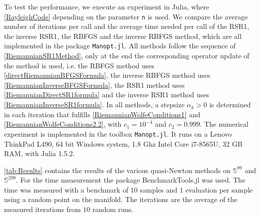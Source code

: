 To test the performance, we execute an experiment in Julia, where \cref{RayleighCode} depending on the parameter \lstinline!n! is used. We compare the average number of iterations per call and the average time needed per call of the RSR1, the inverse RSR1, the RBFGS and the inverse RBFGS method, which are all implemented in the package \lstinline!Manopt.jl!. All methods follow the sequence of \cref{RiemannianSR1Method}, only at the end the corresponding operator update of the method is used, i.e. the RBFGS method uses \cref{directRiemannianBFGSFormula}, the inverse RBFGS method uses \cref{RiemannianInverseBFGSFormula}, the RSR1 method uses \cref{RiemannianDirectSR1formula} and the inverse RSR1 method uses \cref{RiemannianInverseSR1formula}. In all methods, a stepsize $\alpha_k > 0$ is determined in each iteration that fulfills \cref{RiemannianWolfeConditions1} and \cref{RiemannianWolfeConditions2.2}, with $c_1 = 10^{−4}$ and $c_2 = 0.999$. The numerical experiment is implemented in the toolbox \lstinline!Manopt.jl!. It runs on a Lenovo ThinkPad L490, 64 bit Windows system, 1.8 Ghz Intel Core i7-8565U, 32 GB RAM, with Julia 1.5.2.
\begin{table}[H]\label{tab:Results}
    \caption{Comparison of the quasi-Newton methods.}
\end{table}
\cref{tab:Results} contains the results of the various quasi-Newton methods on $\mathbb{S}^{99}$ and $\mathbb{S}^{299}$. For the time measurement the package BenchmarkTools.jl was used. The time was measured with a benchmark of $10$ samples and $1$ evaluation per sample using a random point on the manifold. The iterations are the average of the measured iterations from $10$ random runs. \\
